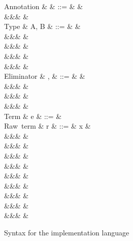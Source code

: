 \begin{figure}
\begin{syntaxfig}
\mbox{Annotation}
&
\alpha
&
::=
&
\top %
&
\\
&&&
\bot %
&
\\[2mm]
\mbox{Type}
&
A, B
&
::=
&
\tyBool
&
\\
&&&
\tyInt
&
\\
&&&
\tyList
&
\\
&&&
&
\\
&&&
&
\\[2mm]
\mbox{Eliminator}
&
\sigma, \tau
&
::=
&
&
\\
&&&
&
\\
&&&
&
\\
&&&
&
\\[2mm]
\mbox{Term}
&
e
&
::=
&
\\[2mm]
\mbox{Raw term}
&
r
&
::=
&
x
&
\\
&&&
\exTrue \mid \exFalse
&
\\
&&&
&
\\
&&&
&
\\
&&&
&
\\
&&&
&
\\
&&&
&
\\
&&&
\exNil
&
\\
&&&
&
\\
&&&
&
\end{syntaxfig}
\caption{Syntax for the implementation language}
\label{fig:impl-language:syntax}
\end{figure}
